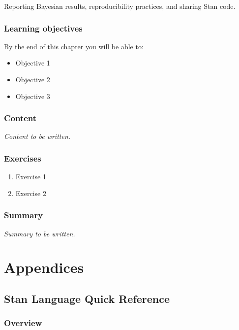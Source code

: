 \documentclass[
  11pt,
  a4paper,
  oneside,
  openany]{scrbook}
\providecommand{\tightlist}{%
  \setlength{\itemsep}{0pt}\setlength{\parskip}{0pt}}\usepackage{longtable,booktabs,array}
\begin{document}
Reporting Bayesian results, reproducibility practices, and sharing Stan
code.

\section{Learning objectives}\label{learning-objectives-15}

By the end of this chapter you will be able to:

\begin{itemize}
\tightlist
\item[$\square$]
  Objective 1
\item[$\square$]
  Objective 2
\item[$\square$]
  Objective 3
\end{itemize}

\section{Content}\label{content-14}

\emph{Content to be written.}

\section{Exercises}\label{exercises-15}

\begin{enumerate}
\def\labelenumi{\arabic{enumi}.}
\tightlist
\item
  Exercise 1
\item
  Exercise 2
\end{enumerate}

\section{Summary}\label{summary-15}

\emph{Summary to be written.}

\part{Appendices}

\chapter{Stan Language Quick
Reference}\label{stan-language-quick-reference}

\section{Overview}\label{overview-16}
\end{document}
